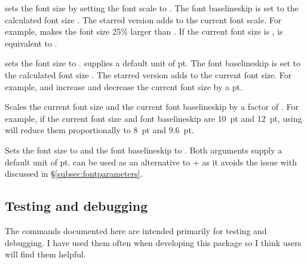 \documentclass{beery}
\begin{document}
\nopagebreak\newline
{}

 sets the font size by setting the font scale to .
The font baselineskip is set to the calculated font size \texttimes{} .
The starred version  adds  to the current font scale.
For example,  makes the font size 25\% larger than .
If the current font size is ,  is equivalent to .

\nopagebreak\newline
{}

 sets the font size to .
 supplies a default unit of \unit{pt}.
The font baselineskip is set to the calculated font size \texttimes{} .
The starred version  adds  to the current font size.
For example,  and \marg{-1pt} increase and decrease the current font size by a \unit{pt}.

\KeepNextPar*

Scales the current font size and the current font baselineskip by a factor of .
For example, if the current font size and font baselineskip are \qty{10}{pt} and \qty{12}{pt}, using  will reduce them proportionally to \qty{8}{pt} and \qty{9.6}{pt}.

\KeepNextPar*

Sets the font size to  and the font baselineskip to .
Both arguments supply a default unit of \unit{pt}.
 can be used as an alternative to  +  as it avoids the issue with  discussed in \S\ref{subsec:fontparameters}.

\subsection{Testing and debugging}
\label{subsec:debug}

The commands documented here are intended primarily for testing and debugging.
I have used them often when developing this package so I think users will find them helpful.
\end{document}
